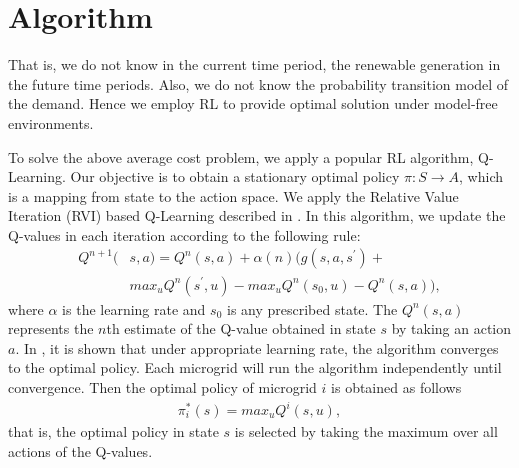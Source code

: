 \section{Algorithm}\label{sec:algo}
That is, we do not know in the current time period, the renewable generation in the future time periods.
 Also, we do not know the probability transition model of the demand. Hence we employ  RL to provide optimal solution under model-free environments.

To solve the above average cost problem, we apply a popular RL algorithm, Q-Learning. Our objective is to obtain a stationary optimal policy $\pi : S \rightarrow A$, which is a mapping from state to the action space.  
We apply the Relative Value Iteration (RVI) based Q-Learning described in \cite{avgcost}. In this algorithm, we update the Q-values in each iteration according to the following rule:
\begin{align}
Q^{n+1}(&s,a) = Q^{n}(s,a) + \alpha(n)(g(s,a,s^{'}) + \nonumber\\ &  max_{u} Q^{n}(s^{'},u) - max_{u} Q^{n}(s_{0},u) - Q^{n}(s,a)),
\end{align}
where $\alpha$ is the learning rate and $s_{0}$ is any prescribed state.
The $Q^n(s,a)$ represents the $n$th estimate of the Q-value  obtained in state $s$ by taking an action $a$. In \cite{avgcost}, it is shown that under appropriate learning rate, the algorithm converges to the  optimal policy. 
Each microgrid will run the algorithm independently until convergence. Then the optimal policy of microgrid $i$ is obtained as follows
\begin{align}
\pi_{i}^{*}(s) = max_{u}Q^{i}(s,u),
\end{align}
that is, the optimal policy in state $s$ is selected by taking the maximum over all actions of the Q-values.  

